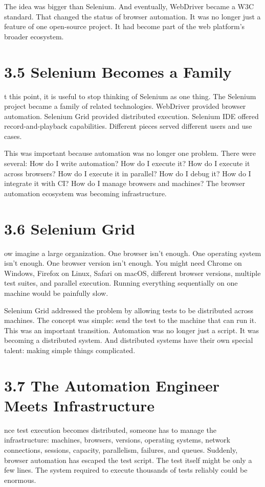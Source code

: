 \documentclass[11pt, a4paper, openany]{book}
\newcommand{\initialcap}[1]{{\fontfamily{lmss}\selectfont\huge\textbf{#1}}}
\begin{document}
The idea was bigger than Selenium. And eventually, WebDriver became a W3C standard. That changed the status of browser automation. It was no longer just a feature of one open-source project. It had become part of the web platform's broader ecosystem.

\section{3.5 Selenium Becomes a Family}
\noindent \initialcap{A}t this point, it is useful to stop thinking of Selenium as one thing. The Selenium project became a family of related technologies. WebDriver provided browser automation. Selenium Grid provided distributed execution. Selenium IDE offered record-and-playback capabilities. Different pieces served different users and use cases.

This was important because automation was no longer one problem. There were several: How do I write automation? How do I execute it? How do I execute it across browsers? How do I execute it in parallel? How do I debug it? How do I integrate it with CI? How do I manage browsers and machines? The browser automation ecosystem was becoming infrastructure.

\section{3.6 Selenium Grid}
\noindent \initialcap{N}ow imagine a large organization. One browser isn't enough. One operating system isn't enough. One browser version isn't enough. You might need Chrome on Windows, Firefox on Linux, Safari on macOS, different browser versions, multiple test suites, and parallel execution. Running everything sequentially on one machine would be painfully slow.

Selenium Grid addressed the problem by allowing tests to be distributed across machines. The concept was simple: send the test to the machine that can run it. This was an important transition. Automation was no longer just a script. It was becoming a distributed system. And distributed systems have their own special talent: making simple things complicated.

\section{3.7 The Automation Engineer Meets Infrastructure}
\noindent \initialcap{O}nce test execution becomes distributed, someone has to manage the infrastructure: machines, browsers, versions, operating systems, network connections, sessions, capacity, parallelism, failures, and queues. Suddenly, browser automation has escaped the test script. The test itself might be only a few lines. The system required to execute thousands of tests reliably could be enormous. 
\end{document}
